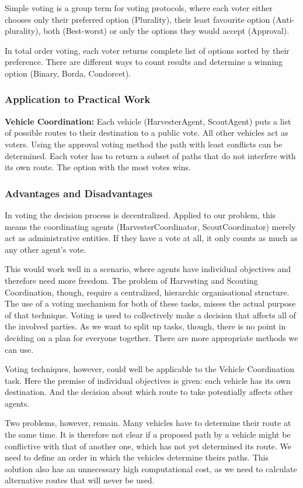 Simple voting is a group term for voting protocols, where each voter either chooses only their preferred option (Plurality), their least favourite option (Anti-plurality), both (Best-worst) or only the options they would accept (Approval).

In total order voting, each voter returns complete list of options sorted by their preference. There are different ways to count results and determine a winning option (Binary, Borda, Condorcet).

\subsubsection{Application to Practical Work}

\textbf{Vehicle Coordination:} Each vehicle (HarvesterAgent, ScoutAgent) puts a list of possible routes to their destination to a public vote. All other vehicles act as voters. Using the approval voting method the path with least conflicts can be determined. Each voter has to return a subset of paths that do not interfere with its own route. The option with the most votes wins.

\subsubsection{Advantages and Disadvantages}

In voting the decision process is decentralized. Applied to our problem, this means the coordinating agents (HarvesterCoordinator, ScoutCoordinator) merely act as administrative entities. If they have a vote at all, it only counts as much as any other agent’s vote. 

This would work well in a scenario, where agents have individual objectives and therefore need more freedom. The problem of Harvesting and Scouting Coordination, though, require a centralized, hierarchic organisational structure. The use of a voting mechanism for both of these tasks, misses the actual purpose of that technique. Voting is used to collectively make a decision that affects all of the involved parties. As we want to split up tasks, though, there is no point in deciding on a plan for everyone together. There are more appropriate methods we can use.

Voting techniques, however, could well be applicable to the Vehicle Coordination task. Here the premise of individual objectives is given: each vehicle has its own destination. And the decision about which route to take potentially affects other agents. 

Two problems, however, remain. Many vehicles have to determine their route at the same time. It is therefore not clear if a proposed path by a vehicle might be conflictive with that of another one, which has not yet determined its route. We need to define an order in which the vehicles determine theirs paths. This solution also has an unnecessary high computational cost, as we need to calculate alternative routes that will never be used.



